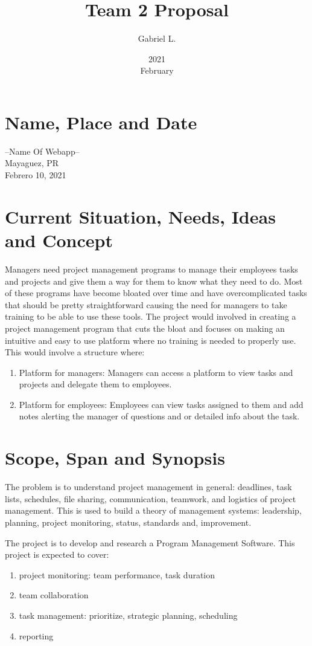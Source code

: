 \documentclass{article}
\title{Team 2 Proposal}
\date{2021 \\ February}
\author{Gabriel L.}
\begin{document}
\maketitle
\section{Name, Place and Date}
--Name Of Webapp--\\
Mayaguez, PR\\
Febrero 10, 2021
\section{Current Situation, Needs, Ideas and Concept}
\vspace{10}
Managers need project management programs to manage their employees tasks and projects and give them a way for them to know what they need to do. Most of these programs have become bloated over time and have overcomplicated tasks that should be pretty straightforward causing the need for managers to take training to be able to use these tools. The project would involved in creating a project management program that cuts the bloat and focuses on making an intuitive and easy to use platform where no training is needed to properly use. This would involve a structure where:
\begin{enumerate}
\item Platform for managers: Managers can access a platform to view tasks and projects and delegate them to employees.
\item Platform for employees: Employees can view tasks assigned to them and add notes alerting the manager of questions and or detailed info about the task.
\end{enumerate}
\section{Scope, Span and Synopsis}
\vspace{10}
The problem is to understand project management in general: deadlines, task lists, schedules, file sharing, communication, teamwork, and logistics of project management. This is used to build a theory of management systems: leadership, planning, project monitoring, status, standards and, improvement.

The project is to develop and research a Program Management Software. This project is expected to cover:
\begin{enumerate}
    \item project monitoring: team performance, task duration
    \item team collaboration
    \item task management: prioritize, strategic planning,  scheduling
    \item reporting
\end{enumerate}
\end{document}
